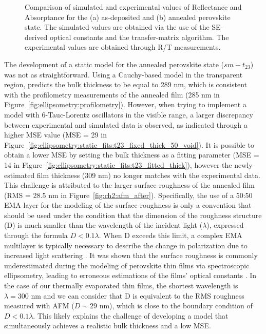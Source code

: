 \begin{figure}[htbp]
    \caption{Comparison of simulated and experimental values of Reflectance and Absorptance for the (a) as-deposited and (b) annealed perovskite state. The simulated values are obtained via the use of the SE-derived optical constants and the transfer-matrix algorithm. The experimental values are obtained through R/T measurements.}
    \label{fig:ellipsometry:RT}
\end{figure}

 
The development of a static model for the annealed perovskite state ($sm-t_{\text{23}}$) was not as straightforward. Using a Cauchy-based model in the transparent region, predicts the bulk thickness to be equal to 289 nm, which is consistent with the profilometry measurements of the annealed film (285 nm in Figure~\ref{fig:ellipsometry:profilometry}). However, when trying to implement a model with 6-Tauc-Lorentz oscillators in the visible range, a larger discrepancy between experimental and simulated data is observed, as indicated through a higher MSE value (MSE = 29 in Figure~\ref{fig:ellipsometry:static_fits:t23_fixed_thick_50_void}). It is possible to obtain a lower MSE by setting the bulk thickness as a fitting parameter (MSE = 14 in Figure~\ref{fig:ellipsometry:static_fits:t23_fitted_thick}), however the newly estimated film thickness (309 nm) no longer matches with the experimental data. This challenge is attributed to the larger surface roughness of the annealed film (RMS = 28.5 nm in Figure~\ref{fig:ch2:afm_after}). Specifically, the use of a 50:50 EMA layer for the modeling of the surface roughness is only a convention that should be used under the condition that the dimension of the roughness structure (D) is much smaller than the wavelength of the incident light ($\lambda$), expressed through the formula $D<0.1\lambda$. When D exceeds this limit, a complex EMA multilayer is typically necessary to describe the change in polarization due to increased light scattering \cite{Akagawa2011High-precisionEllipsometry}. It was shown that the surface roughness is commonly underestimated during the modeling of perovskite thin films via spectroscopic ellipsometry, leading to erroneous estimations of the films' optical constants \cite{Fujiwara2017DeterminationMaterials}. In the case of our thermally evaporated thin films, the shortest wavelength is $\lambda=300$ nm and we can consider that D is equivalent to the RMS roughness measured with AFM ($D \sim 29$ nm), which is close to the boundary condition of $D<0.1\lambda$. This likely explains the challenge of developing a model that simultaneously achieves a realistic bulk thickness and a low MSE. 


